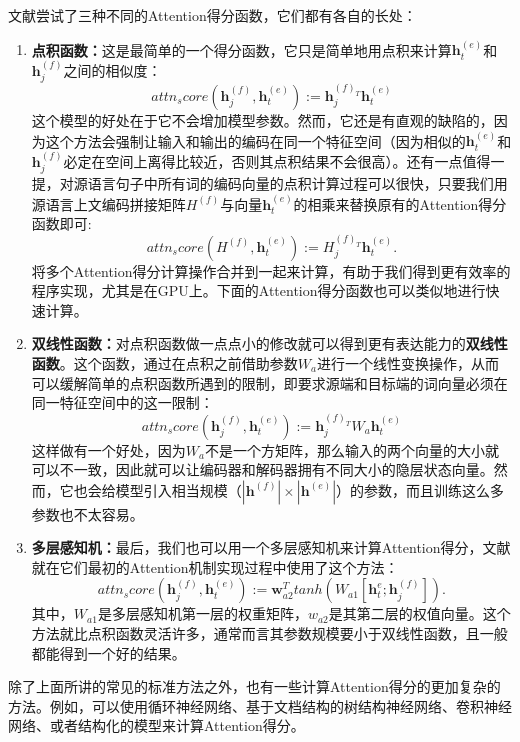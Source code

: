 \documentclass[10pt,a4paper]{ctexart}
\begin{document}
文献\cite{luong2015effective}尝试了三种不同的Attention得分函数，它们都有各自的长处：
\begin{enumerate}
\item[] \textbf{点积函数：}这是最简单的一个得分函数，它只是简单地用点积来计算$\textbf{h}_t^{(e)}$和$\textbf{h}_j^{(f)}$之间的相似度：
\[
 attn_score(\textbf{h}_j^{(f)},\textbf{h}_t^{(e)}) := \textbf{h}_j^{(f)_{T}}\textbf{h}_t^{(e)}
\]
这个模型的好处在于它不会增加模型参数。然而，它还是有直观的缺陷的，因为这个方法会强制让输入和输出的编码在同一个特征空间（因为相似的$\textbf{h}_t^{(e)}$和$\textbf{h}_j^{(f)}$必定在空间上离得比较近，否则其点积结果不会很高）。还有一点值得一提，对源语言句子中所有词的编码向量的点积计算过程可以很快，只要我们用源语言上文编码拼接矩阵$H^{(f)}$与向量$\textbf{h}_t^{(e)}$的相乘来替换原有的Attention得分函数即可:
\[
 attn_score(H^{(f)}, \textbf{h}_t^{(e)}) := H_j^{(f)_T}\textbf{h}_t^{(e)}.
\]
将多个Attention得分计算操作合并到一起来计算，有助于我们得到更有效率的程序实现，尤其是在GPU上。下面的Attention得分函数也可以类似地进行快速计算。
\item[] \textbf{双线性函数：}对点积函数做一点点小的修改就可以得到更有表达能力的\textbf{双线性函数}。这个函数，通过在点积之前借助参数$W_a$进行一个线性变换操作，从而可以缓解简单的点积函数所遇到的限制，即要求源端和目标端的词向量必须在同一特征空间中的这一限制：
\[
 attn_score(\textbf{h}_j^{(f)},\textbf{h}_t^{(e)}) := \textbf{h}_j^{(f)_{T}}W_a\textbf{h}_t^{(e)}
\]
这样做有一个好处，因为$W_a$不是一个方矩阵，那么输入的两个向量的大小就可以不一致，因此就可以让编码器和解码器拥有不同大小的隐层状态向量。然而，它也会给模型引入相当规模（$|\textbf{h}^{(f)}| \times |\textbf{h}^{(e)}|$）的参数，而且训练这么多参数也不太容易。
\item[] \textbf{多层感知机：}最后，我们也可以用一个多层感知机来计算Attention得分，文献\cite{bahdanau2014neural}就在它们最初的Attention机制实现过程中使用了这个方法：
\[
 attn_score(\textbf{h}_j^{(f)},\textbf{h}_t^{(e)}) := \textbf{w}_{a2}^{T}tanh(W_{a1}[\textbf{h}_t^{e};\textbf{h}_j^{(f)}]).
\]
其中，$W_{a1}$是多层感知机第一层的权重矩阵，$w_{a2}$是其第二层的权值向量。这个方法就比点积函数灵活许多，通常而言其参数规模要小于双线性函数，且一般都能得到一个好的结果。
\end{enumerate}

除了上面所讲的常见的标准方法之外，也有一些计算Attention得分的更加复杂的方法。例如，可以使用循环神经网络\cite{yang2016neural}、基于文档结构的树结构神经网络\cite{yang2016hierarchical}、卷积神经网络\cite{allamanis2016convolutional}、或者结构化的模型\cite{kim2017structured}来计算Attention得分。
\end{document}
